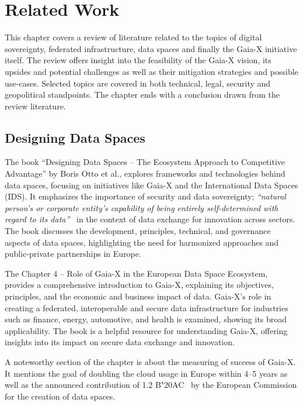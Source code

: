 \chapter{Related Work}\label{ch:related-work}

\begin{chapterabstract}
    This chapter covers a review of literature related to the topics of digital sovereignty, federated infrastructure, data spaces and finally the Gaia-X initiative itself.
    The review offers insight into the feasibility of the Gaia-X vision, its upsides and potential challenges as well as their mitigation strategies and possible use-cases.
    Selected topics are covered in both technical, legal, security and geopolitical standpoints.
    The chapter ends with a conclusion drawn from the review literature.
\end{chapterabstract}

\section{Designing Data Spaces}\label{sec:designing-data-spaces}

The book ``Designing Data Spaces -- The Ecosystem Approach to Competitive Advantage'' by Boris Otto et al., explores frameworks and technologies behind data spaces, focusing on initiatives like Gaia-X and the International Data Spaces (IDS)\cite{designing_dataspaces}.
It emphasizes the importance of security and data sovereignty; \textit{``natural person’s or corporate entity’s capability of being entirely self-determined with regard to its data''}~\cite{designing_dataspaces} in the context of data exchange for innovation across sectors.
The book discusses the development, principles, technical, and governance aspects of data spaces, highlighting the need for harmonized approaches and public-private partnerships in Europe.

The Chapter 4 -- Role of Gaia-X in the European Data Space Ecosystem, provides a comprehensive introduction to Gaia-X, explaining its objectives, principles, and the economic and business impact of data.
Gaia-X's role in creating a federated, interoperable and secure data infrastructure for industries such as finance, energy, automotive, and health is examined, showing its broad applicability.
The book is a helpful resource for understanding Gaia-X, offering insights into its impact on secure data exchange and innovation.

A noteworthy section of the chapter is about the measuring of success of Gaia-X.
It mentions the goal of doubling the cloud usage in Europe within 4--5 years as well as the announced contribution of 1.2 B\char"20AC~ by the European Commission for the creation of data spaces. %

